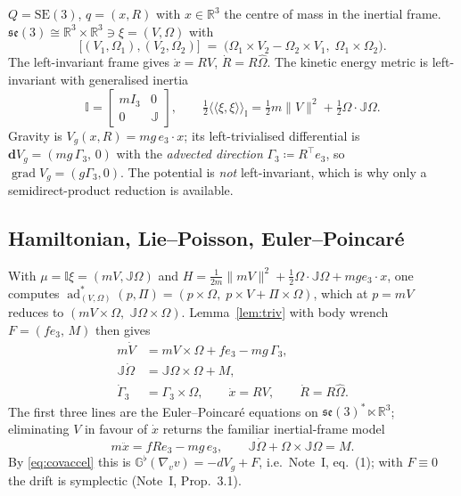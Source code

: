 \documentclass[11pt,a4paper]{article}
\newcommand{\Gm}{\mathbb{G}}
\newcommand{\Rm}{\mathbb{R}}
\newcommand{\Jm}{\mathbb{J}}
\newcommand{\Ig}{\mathbb{I}}
\newcommand{\ip}[2]{\langle\!\langle #1 , #2 \rangle\!\rangle}
\newcommand{\Gflat}{\Gm^{\flat}}
\newcommand{\grad}{\operatorname{grad}}
\newcommand{\norm}[1]{\lVert #1 \rVert}
\newcommand{\se}{\mathfrak{se}(3)}
\newcommand{\SE}{\mathrm{SE}(3)}
\newcommand{\ad}{\operatorname{ad}}
\theoremstyle{plain}
\theoremstyle{definition}
\theoremstyle{remark}
\begin{document}
$Q = \SE$, $q = (x,R)$ with $x\in\Rm^3$ the centre of mass in the inertial frame.
$\se \cong \Rm^3\times\Rm^3 \ni \xi = (V,\Omega)$ with
\begin{equation}
  \big[(V_1,\Omega_1),(V_2,\Omega_2)\big]
  \;=\; \big(\Omega_1\times V_2 - \Omega_2\times V_1,\; \Omega_1\times\Omega_2\big).
\end{equation}
The left-invariant frame gives $\dot x = RV$, $\dot R = R\hat\Omega$. The kinetic
energy metric is left-invariant with generalised inertia
\begin{equation}
  \Ig = \begin{bmatrix} mI_3 & 0\\ 0 & \Jm\end{bmatrix},
  \qquad
  \tfrac12\ip{\xi}{\xi}_{\Ig} = \tfrac12 m\norm{V}^2 + \tfrac12\Omega\cdot\Jm\Omega .
\end{equation}
Gravity is $V_g(x,R) = mg\,e_3\cdot x$; its left-trivialised differential is
$\mathbf{d}V_g = (mg\,\Gamma_{\!3},\,0)$ with the \emph{advected direction}
$\Gamma_{\!3}\coloneqq R^{\top}e_3$, so $\grad V_g = (g\Gamma_{\!3},0)$. The potential is
\emph{not} left-invariant, which is why only a semidirect-product reduction is
available.

\subsection{Hamiltonian, Lie--Poisson, Euler--Poincar\'e}

With $\mu = \Ig\xi = (mV,\Jm\Omega)$ and
$H = \tfrac{1}{2m}\norm{mV}^2 + \tfrac12\Omega\cdot\Jm\Omega + mge_3\cdot x$,
one computes
$\ad^{*}_{(V,\Omega)}(p,\Pi) = (p\times\Omega,\; p\times V + \Pi\times\Omega)$,
which at $p=mV$ reduces to $(mV\times\Omega,\;\Jm\Omega\times\Omega)$.
Lemma~\ref{lem:triv} with body wrench $F = (fe_3,\,M)$ then gives
\begin{equation}
  \boxed{\;
  \begin{aligned}
    m\dot V &= mV\times\Omega + f e_3 - mg\,\Gamma_{\!3}, \\
    \Jm\dot\Omega &= \Jm\Omega\times\Omega + M, \\
    \dot\Gamma_{\!3} &= \Gamma_{\!3}\times\Omega,
    \qquad \dot x = RV, \qquad \dot R = R\hat\Omega .
  \end{aligned}\;}
  \label{eq:se3-EP}
\end{equation}
The first three lines are the Euler--Poincar\'e equations on
$\se^{*}\ltimes\Rm^3$; eliminating $V$ in favour of $\dot x$ returns the familiar
inertial-frame model
\begin{equation}
  m\ddot x = f R e_3 - mg\,e_3,
  \qquad
  \Jm\dot\Omega + \Omega\times\Jm\Omega = M .
  \label{eq:se3-NE}
\end{equation}
By \eqref{eq:covaccel} this is $\Gflat(\nabla_vv) = -dV_g + F$, i.e.\ Note~I,
eq.~(1); with $F\equiv0$ the drift is symplectic (Note~I, Prop.~3.1).
\end{document}
